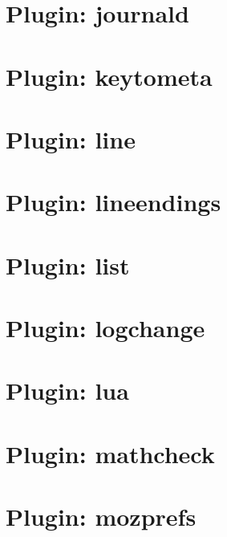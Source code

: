\documentclass[twoside]{book}
\newcommand{\+}{\discretionary{\mbox{\scriptsize$\hookleftarrow$}}{}{}}
\begin{document}
\chapter{Plugin\+: journald}
\label{md_src_plugins_journald_README}
\hypertarget{md_src_plugins_journald_README}{}

\chapter{Plugin\+: keytometa}
\label{md_src_plugins_keytometa_README}
\hypertarget{md_src_plugins_keytometa_README}{}

\chapter{Plugin\+: line}
\label{md_src_plugins_line_README}
\hypertarget{md_src_plugins_line_README}{}

\chapter{Plugin\+: lineendings}
\label{md_src_plugins_lineendings_README}
\hypertarget{md_src_plugins_lineendings_README}{}

\chapter{Plugin\+: list}
\label{md_src_plugins_list_README}
\hypertarget{md_src_plugins_list_README}{}

\chapter{Plugin\+: logchange}
\label{md_src_plugins_logchange_README}
\hypertarget{md_src_plugins_logchange_README}{}

\chapter{Plugin\+: lua}
\label{md_src_plugins_lua_README}
\hypertarget{md_src_plugins_lua_README}{}

\chapter{Plugin\+: mathcheck}
\label{md_src_plugins_mathcheck_README}
\hypertarget{md_src_plugins_mathcheck_README}{}

\chapter{Plugin\+: mozprefs}
\label{md_src_plugins_mozprefs_autoconfig_README}
\hypertarget{md_src_plugins_mozprefs_autoconfig_README}{}

\end{document}
